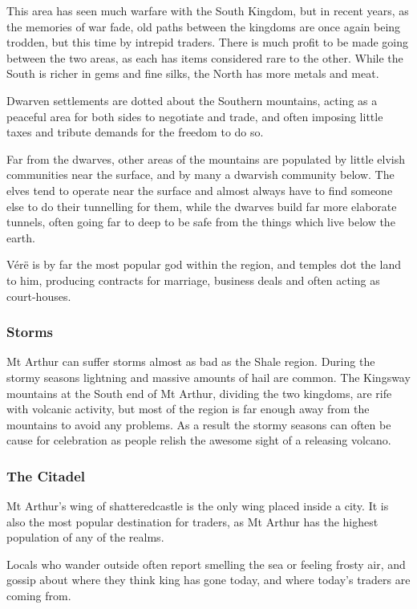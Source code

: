 \begin{multicols}{2}
This area has seen much warfare with the South Kingdom, but in recent years, as the memories of war fade, old paths between the kingdoms are once again being trodden, but this time by intrepid traders.
There is much profit to be made going between the two areas, as each has items considered rare to the other.
While the South is richer in gems and fine silks, the North has more metals and meat.

Dwarven settlements are dotted about the Southern mountains, acting as a peaceful area for both sides to negotiate and trade, and often imposing little taxes and tribute demands for the freedom to do so.

Far from the dwarves, other areas of the mountains are populated by little elvish communities near the surface, and by many a dwarvish community below.  The elves tend to operate near the surface and almost always have to find someone else to do their tunnelling for them, while the dwarves build far more elaborate tunnels, often going far to deep to be safe from the things which live below the earth.

V\'{e}r\"{e} is by far the most popular god within the region, and temples dot the land to him, producing contracts for marriage, business deals and often acting as court-houses.

\subsubsection{Storms}

Mt Arthur can suffer storms almost as bad as the Shale region.
During the stormy seasons lightning and massive amounts of hail are common.
The Kingsway mountains at the South end of Mt Arthur, dividing the two kingdoms, are rife with volcanic activity, but most of the region is far enough away from the mountains to avoid any problems.
As a result the stormy seasons can often be cause for celebration as people relish the awesome sight of a releasing volcano.

\subsubsection{The Citadel}

Mt Arthur's wing of \gls{shatteredcastle} is the only wing placed inside a city.
It is also the most popular destination for traders, as Mt Arthur has the highest population of any of the realms.

Locals who wander outside often report smelling the sea or feeling frosty air, and gossip about where they think \gls{king} has gone today, and where today's traders are coming from.


\end{multicols}

